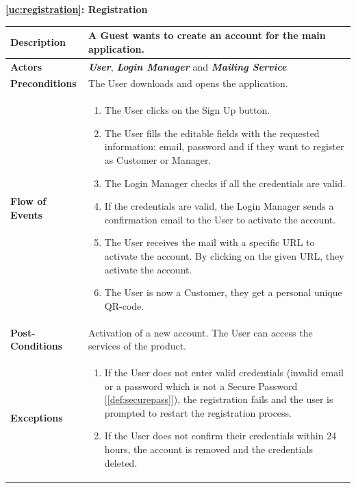 \documentclass[a4paper, 12pt, oneside]{article}
\begin{document}
\begin{center}
{\textbf{\ref{uc:registration}: Registration}}
\end{center}
\begin{tabularx}{\linewidth}{| l | X |}
	
	\hline
	\textbf{Description} & A Guest wants to create an account for the main application.\\
	

	\hline
	\textbf{Actors} & \textbf{\textit{User}}, \textbf{\textit{Login Manager}} and \textbf{\textit{Mailing Service}}\\
	
	\hline
	\textbf{Preconditions} & The User downloads and opens the application.\\
	
	\hline
	\textbf{Flow of Events} & \parbox{0.7\textwidth}{	
		\begin{enumerate}
			\item The User clicks on the Sign Up button.
			\item The User fills the editable fields with the requested information: email, password and if they want to register as Customer or Manager.
			\item The Login Manager checks if all the credentials are valid.
			\item If the credentials are valid, the Login Manager sends a confirmation email to the User to activate the account.
			\item The User receives the mail with a specific URL to activate the account. By clicking on the given URL, they activate the account.
			\item The User is now a Customer, they get a personal unique QR-code.
	\end{enumerate}}\\
	
	\hline
	\textbf{Post-Conditions} & Activation of a new account. The User can access the services of the product.\\
	
	\hline
	\textbf{Exceptions} & \parbox{0.7\textwidth}{ \begin{enumerate}
			\item If the User does not enter valid credentials (invalid email or a password which is not a Secure Password [\ref{def:securepass}]), the registration fails and the user is prompted to restart the registration process.
			\item If the User does not confirm their credentials within 24 hours, the account is removed and the credentials deleted.
		\end{enumerate}}\\

	\hline
	
\end{tabularx}
\end{document}
